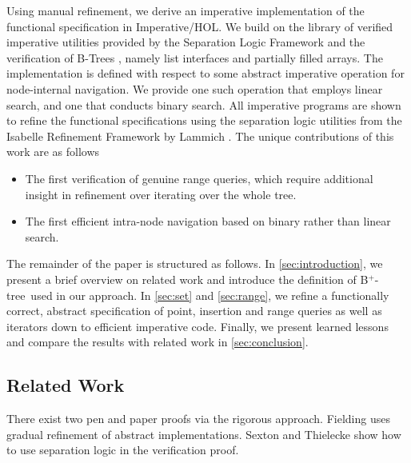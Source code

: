 \documentclass[a4paper,UKenglish,cleveref, autoref, thm-restate]{lipics-v2021}
\newcommand{\btree}{B$^+$-tree}
\begin{document}
Using manual refinement, we derive an imperative implementation of the functional specification
in Imperative/HOL.
We build on the library of verified imperative utilities
provided by the Separation Logic Framework \cite{DBLP:journals/afp/LammichM12}
and the verification of B-Trees \cite{DBLP:journals/afp/Mundler21},
namely list interfaces and partially filled arrays.
The implementation is defined with respect to some abstract imperative
operation for node-internal navigation.
We provide one such operation that employs linear search,
and one that conducts binary search.
All imperative programs are shown to refine the functional specifications
using the separation logic utilities from the Isabelle Refinement Framework by
Lammich \cite{DBLP:journals/jar/Lammich19}. The unique contributions of this work are as follows
\begin{itemize}
   \item The first verification of genuine range queries,
         which require additional insight in refinement over iterating over the whole tree.
   \item The first efficient intra-node navigation based on binary rather than linear search.
\end{itemize}

The remainder of the paper is structured as follows.
In \autoref{sec:introduction}, we present a brief overview on related
work and introduce the definition of \btree\ used in our approach.
In \autoref{sec:set} and \autoref{sec:range},
we refine a functionally correct, abstract specification of
point, insertion and range queries as well as iterators
down to efficient imperative code.
Finally, we present learned lessons and compare the results with related work
in \autoref{sec:conclusion}.

\subsection{Related Work}
\label{sec:related_work}

There exist two pen and paper proofs via the rigorous approach.
Fielding \cite{Fielding80} uses gradual refinement of abstract
implementations.
Sexton and Thielecke \cite{DBLP:journals/entcs/SextonT08} show how to use 
separation logic in the verification proof.
\end{document}
